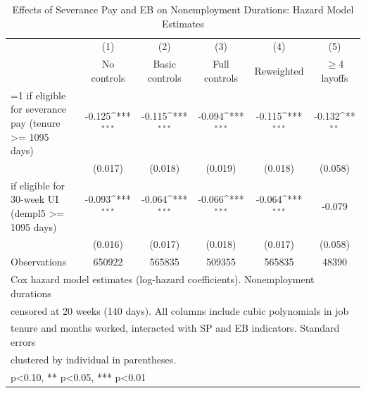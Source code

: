 \begin{table}[htbp]\centering
\def\sym#1{\ifmmode^{#1}\else\(^{#1}\)\fi}
\caption{Effects of Severance Pay and EB on Nonemployment Durations: Hazard Model Estimates}
\begin{tabular}{l*{5}{c}}
\toprule
                    &\multicolumn{1}{c}{(1)}&\multicolumn{1}{c}{(2)}&\multicolumn{1}{c}{(3)}&\multicolumn{1}{c}{(4)}&\multicolumn{1}{c}{(5)}\\
                    &\multicolumn{1}{c}{No controls}&\multicolumn{1}{c}{Basic controls}&\multicolumn{1}{c}{Full controls}&\multicolumn{1}{c}{Reweighted}&\multicolumn{1}{c}{$\geq$4 layoffs}\\
\midrule
=1 if eligible for severance pay (tenure >= 1095 days)&      -0.125\sym{***}&      -0.115\sym{***}&      -0.094\sym{***}&      -0.115\sym{***}&      -0.132\sym{**} \\
                    &     (0.017)         &     (0.018)         &     (0.019)         &     (0.018)         &     (0.058)         \\
\addlinespace
=1 if eligible for 30-week UI (dempl5 >= 1095 days)&      -0.093\sym{***}&      -0.064\sym{***}&      -0.066\sym{***}&      -0.064\sym{***}&      -0.079         \\
                    &     (0.016)         &     (0.017)         &     (0.018)         &     (0.017)         &     (0.058)         \\
\midrule
Observations        &      650922         &      565835         &      509355         &      565835         &       48390         \\
\bottomrule
\multicolumn{6}{l}{\footnotesize Cox hazard model estimates (log-hazard coefficients). Nonemployment durations}\\
\multicolumn{6}{l}{\footnotesize censored at 20 weeks (140 days). All columns include cubic polynomials in job}\\
\multicolumn{6}{l}{\footnotesize tenure and months worked, interacted with SP and EB indicators. Standard errors}\\
\multicolumn{6}{l}{\footnotesize clustered by individual in parentheses.}\\
\multicolumn{6}{l}{\footnotesize * p<0.10, ** p<0.05, *** p<0.01}\\
\end{tabular}
\end{table}
